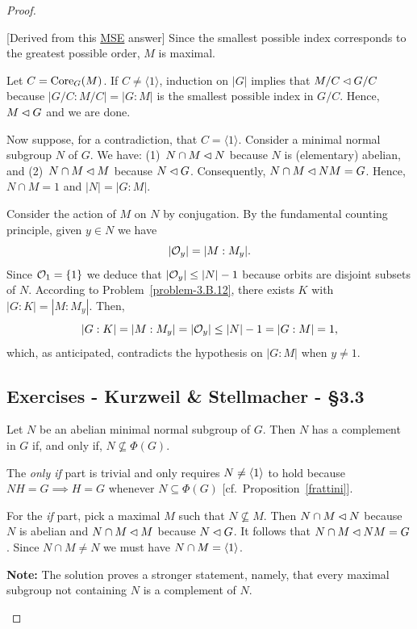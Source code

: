 \begin{proof}
\begin{solution} {[Derived from this \href{https://math.stackexchange.com/a/1383208/269050}{MSE} answer]} Since the smallest possible index corresponds to the greatest possible order, $M$ is maximal.

Let $C={\rm Core}_G(M)$. If $C\ne\langle1\rangle$, induction on $|G|$ implies that $M/C\lhd G/C$ because $|G/C:M/C|=|G:M|$ is the smallest possible index in $G/C$. Hence, $M\lhd G$ and we are done.

Now suppose, for a contradiction, that $C=\langle1\rangle$. Consider a minimal normal subgroup $N$ of $G$. We have: {\small(1)}~$N\cap M\lhd N$ because $N$ is (elementary) abelian, and {\small(2)}~$N\cap M\lhd M$ because $N\lhd G$. Consequently, $N\cap M\lhd NM=G$. Hence, $N\cap M=1$ and $|N|=|G:M|$.

Consider the action of $M$ on $N$ by conjugation. By the fundamental counting principle, given $y\in N$ we have
$$
    |{\cal O}_y| = |M:M_y|.
$$
Since ${\cal O}_1=\{1\}$ we deduce that $|{\cal O}_y|\le |N|-1$ because orbits are disjoint subsets of $N$. According to Problem~\ref{problem-3.B.12}, there exists $K$ with $|G:K|=|M:M_y|$. Then,
$$
    |G:K| = |M:M_y| = |{\cal O}_y| \le |N|-1 = |G:M|=1,
$$
which, as anticipated, contradicts the hypothesis on $|G:M|$ when $y\ne1$.  \end{solution}

\subsection{Exercises - Kurzweil \& Stellmacher - \S 3.3}

\begin{exr}
    Let\/ $N$ be an abelian minimal normal subgroup of\/ $G$. Then\/ $N$ has a complement in\/ $G$ if, and only if, $N \not\subseteq\Phi(G)$.
\end{exr}

\begin{solution}
    The \textit{only if\/} part is trivial and only requires $N\ne\langle1\rangle$ to hold because $NH=G\implies H=G$ whenever $N\subseteq\Phi(G)$ [cf.~Proposition~\ref{frattini}].
    
    For the \textit{if\/} part, pick a maximal $M$ such that $N\not\subseteq M$. Then $N\cap M\lhd N$ because $N$ is abelian and $N\cap M\lhd M$ because $N\lhd G$. It follows that $N\cap M\lhd NM=G$. Since $N\cap M\ne N$ we must have $N\cap M=\langle1\rangle$.
    
    \textbf{Note:} The solution proves a stronger statement, namely, that every maximal subgroup not containing $N$ is a complement of $N$.
\end{solution}


\end{proof}
